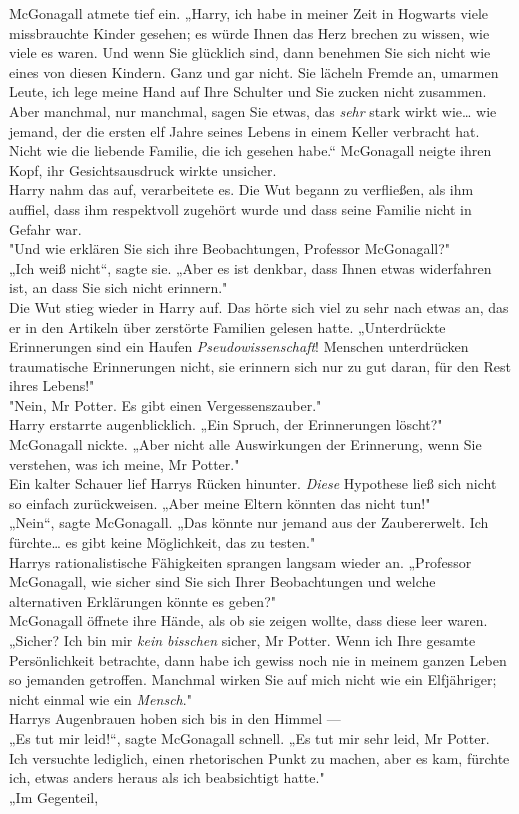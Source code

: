 {McGonagall atmete tief ein. „Harry, ich habe in meiner Zeit in Hogwarts viele missbrauchte Kinder gesehen; es würde Ihnen das Herz brechen zu wissen, wie viele es waren. Und wenn Sie glücklich sind, dann benehmen Sie sich nicht wie eines von diesen Kindern. Ganz und gar nicht. Sie lächeln Fremde an, umarmen Leute, ich lege meine Hand auf Ihre Schulter und Sie zucken nicht zusammen. Aber manchmal, nur manchmal, sagen Sie etwas, das \emph{sehr} stark wirkt wie… wie jemand, der die ersten elf Jahre seines Lebens in einem Keller verbracht hat. Nicht wie die liebende Familie, die ich gesehen habe.“ McGonagall neigte ihren Kopf, ihr Gesichtsausdruck wirkte unsicher.\\ Harry nahm das auf, verarbeitete es. Die Wut begann zu verfließen, als ihm auffiel, dass ihm respektvoll zugehört wurde und dass seine Familie nicht in Gefahr war.\\ "Und wie erklären Sie sich ihre Beobachtungen, Professor McGonagall?"\\ „Ich weiß nicht“, sagte sie. „Aber es ist denkbar, dass Ihnen etwas widerfahren ist, an dass Sie sich nicht erinnern."\\ Die Wut stieg wieder in Harry auf. Das hörte sich viel zu sehr nach etwas an, das er in den Artikeln über zerstörte Familien gelesen hatte. „Unterdrückte Erinnerungen sind ein Haufen \emph{Pseudowissenschaft}! Menschen unterdrücken traumatische Erinnerungen nicht, sie erinnern sich nur zu gut daran, für den Rest ihres Lebens!"\\ "Nein, Mr Potter. Es gibt einen Vergessenszauber."\\ Harry erstarrte augenblicklich. „Ein Spruch, der Erinnerungen löscht?"\\ McGonagall nickte. „Aber nicht alle Auswirkungen der Erinnerung, wenn Sie verstehen, was ich meine, Mr Potter."\\ Ein kalter Schauer lief Harrys Rücken hinunter. \emph{Diese} Hypothese ließ sich nicht so einfach zurückweisen. „Aber meine Eltern könnten das nicht tun!"\\ „Nein“, sagte McGonagall. „Das könnte nur jemand aus der Zaubererwelt. Ich fürchte… es gibt keine Möglichkeit, das zu testen."\\ Harrys rationalistische Fähigkeiten sprangen langsam wieder an. „Professor McGonagall, wie sicher sind Sie sich Ihrer Beobachtungen und welche alternativen Erklärungen könnte es geben?"\\ McGonagall öffnete ihre Hände, als ob sie zeigen wollte, dass diese leer waren. „Sicher? Ich bin mir \emph{kein bisschen} sicher, Mr Potter. Wenn ich Ihre gesamte Persönlichkeit betrachte, dann habe ich gewiss noch nie in meinem ganzen Leben so jemanden getroffen. Manchmal wirken Sie auf mich nicht wie ein Elfjähriger; nicht einmal wie ein \emph{Mensch}."\\ Harrys Augenbrauen hoben sich bis in den Himmel ---\\ „Es tut mir leid!“, sagte McGonagall schnell. „Es tut mir sehr leid, Mr Potter. Ich versuchte lediglich, einen rhetorischen Punkt zu machen, aber es kam, fürchte ich, etwas anders heraus als ich beabsichtigt hatte."\\ „Im Gegenteil, }
